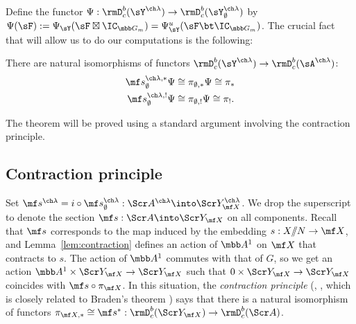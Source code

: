 Define the functor $\Psi : \rmD^b_c(\sY^{\ch\lambda}) \to \rmD^b_c(\sY^{\ch\lambda}_\emptyset)$
by $\Psi(\sF) := \Psi_\sY(\sF \boxtimes \IC_{\mbb G_m}) = \Psi_\sY^u(\sF \bt \IC_{\mbb G_m})$.
The crucial fact that will allow us to do our computations is the following:

\begin{thm}
\notready \label{thm:PsiRadon}
There are natural isomorphisms of functors $\rmD^b_c(\sY^{\ch\lambda}) \to \rmD^b_c(\sA^{\ch\lambda})$:
\begin{align*}
\mf s^{\ch\lambda,*}_\emptyset \Psi
&\cong \pi_{\emptyset,*}\Psi
\cong \pi_*  \\
\mf s^{\ch\lambda,!}_\emptyset \Psi
&\cong \pi_{\emptyset,!}\Psi \cong \pi_!.
\end{align*}
\end{thm}

The theorem will be proved using a standard argument
involving the contraction principle.


\subsection{Contraction principle}

Set $\mf s^{\ch\lambda} = i \circ \mf s^{\ch\lambda}_\emptyset : \Scr A^{\ch\lambda} \into \Scr Y_{\mf X}^{\ch\lambda}$.
We drop the superscript to denote the section $\mf s : \Scr A \into \Scr Y_{\mf X}$
on all components.
Recall that $\mf s$ corresponds to the map induced by
the embedding $s : X/\!\!/N \to \mf X$,
and Lemma~\ref{lem:contraction} defines an action of $\mbb A^1$ on $\mf X$
that contracts to $s$.
The action of $\mbb A^1$ commutes with that of $G$, so we get an action
$\mbb A^1 \times \Scr Y_{\mf X} \to \Scr Y_{\mf X}$
such that $0 \times \Scr Y_{\mf X} \to\Scr Y_{\mf X}$ coincides with
$\mf s \circ \pi_{\mf X}$.
In this situation, the \emph{contraction principle} (\cite[Lemma 5.3]{BFGM},
\cite[Lemme 2.2]{VLaff}, which is closely related to Braden's theorem \cite{Braden}) says that
there is a natural isomorphism of functors $\pi_{\mf X,*} \cong \mf s^* : \rmD^b_c(\Scr Y_{\mf X}) \to \rmD^b_c(\Scr A)$.


